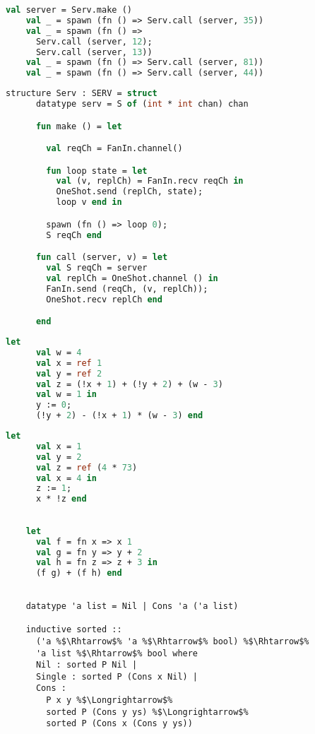 \documentclass{article}
\begin{document}
  \begin{lstlisting}[language=ML, style=codestyle1]
    val server = Serv.make ()
    val _ = spawn (fn () => Serv.call (server, 35))
    val _ = spawn (fn () => 
      Serv.call (server, 12); 
      Serv.call (server, 13))
    val _ = spawn (fn () => Serv.call (server, 81))
    val _ = spawn (fn () => Serv.call (server, 44))
    \end{lstlisting}

  \begin{lstlisting}[language=ML, style=codestyle1]
    structure Serv : SERV = struct 
      datatype serv = S of (int * int chan) chan 

      fun make () = let 

        val reqCh = FanIn.channel()

        fun loop state = let
          val (v, replCh) = FanIn.recv reqCh in 
          OneShot.send (replCh, state);
          loop v end in

        spawn (fn () => loop 0);
        S reqCh end 

      fun call (server, v) = let 
        val S reqCh = server
        val replCh = OneShot.channel () in 
        FanIn.send (reqCh, (v, replCh));
        OneShot.recv replCh end

      end
    \end{lstlisting}

  \begin{lstlisting}[language=ML, style=codestyle1]
    let
      val w = 4
      val x = ref 1
      val y = ref 2
      val z = (!x + 1) + (!y + 2) + (w - 3)
      val w = 1 in
      y := 0;
      (!y + 2) - (!x + 1) * (w - 3) end
    \end{lstlisting}

  \begin{lstlisting}[language=ML, style=codestyle1]
    let 
      val x = 1  
      val y = 2
      val z = ref (4 * 73)
      val x = 4 in 
      z := 1; 
      x * !z end
    \end{lstlisting}

  \begin{lstlisting}[language=ML, style=codestyle1]

    let 
      val f = fn x => x 1
      val g = fn y => y + 2
      val h = fn z => z + 3 in 
      (f g) + (f h) end

  \end{lstlisting}


  \begin{lstlisting}[style=codestyle1, escapechar=\%]

    datatype 'a list = Nil | Cons 'a ('a list)

    inductive sorted ::
      ('a %$\Rhtarrow$% 'a %$\Rhtarrow$% bool) %$\Rhtarrow$%
      'a list %$\Rhtarrow$% bool where
      Nil : sorted P Nil |
      Single : sorted P (Cons x Nil) |
      Cons :
        P x y %$\Longrightarrow$%
        sorted P (Cons y ys) %$\Longrightarrow$%
        sorted P (Cons x (Cons y ys))
    \end{lstlisting}
\end{document}
